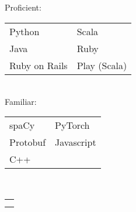 {		
		\majorsection{\awards} 
		\awardAmplify 
		\awardGoldenTicket 
		\awardEbayApi 
		
		\pagebreak
		\majorsection{\projects} 
		\projectParasite 
		\projectPytext 
		
		\majorsection{\educationhistory} 
		\educationUW 
		\educationEvergreen 
		\educationHyogo
	}{ %
		
		\noindent\begin{minipage}[t]{0.275\textwidth}
			
			\sidesection{\educationhistory}	\\[0.25\baselineskip]
			\educationUW 
			\educationEvergreen
			\educationHyogo
			
			\sidesection{\courses} \\
			\sidebarcoursework
			
			
			\sidesection{\skills} \\ 
			\sidesubsection{\skillsprogramming} \\
			Proficient:\\[0.25\baselineskip]
			\begin{tabular}{l l}
				Python &  Scala \\ 
				Java  & Ruby  \\ 
				Ruby on Rails & Play (Scala)\\
			\end{tabular}\\
			Familiar: \\[0.25\baselineskip]
			\begin{tabular}{l l} 
				spaCy & PyTorch \\
				Protobuf & Javascript\\
				C++ & \\
			\end{tabular}

			
			\sidesubsection{\skillslanguage} \\
			\begin{tabular}{l}
				\skillenglish \\
				\skilljapanese
			\end{tabular} \quarterlinebreak \\
			
			
		\end{minipage}
		\hfill
		\begin{minipage}[t]{0.7\textwidth}
			\majorsection{\experience} 
				\jobexpNPD
				\jobexpGSP
				\jobexpGDIIntern	
		\majorsection{\graduatecoursework} 
		\courseworkML
		\courseworkNLM
		\courseworkNLP

		\majorsection{\projectsawards\vspace{-0.25\baselineskip}} 
		\awardAmplify 
		\awardGoldenTicket 
		\awardParasite
		
		\end{minipage}
		
	}
	
